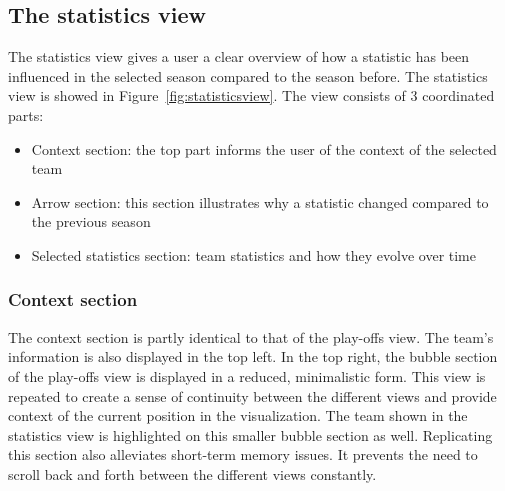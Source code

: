 \documentclass[chi_draft]{sigchi}
\begin{document}
\subsection{The statistics view}
The statistics view gives a user a clear overview of how a statistic has been
influenced in the selected season compared to the season before. The statistics
view is showed in Figure~\ref{fig:statisticsview}. The view consists of 3
coordinated parts:
\begin{itemize}
    \item Context section: the top part informs the user of the context of the
        selected team
    \item Arrow section: this section illustrates why a statistic changed
        compared to the previous season
    \item Selected statistics section: team statistics and how they evolve over
        time
\end{itemize}

\subsubsection{Context section}
The context section is partly identical to that of the play-offs view. The
team's information is also displayed in the top left. In the top right, the
bubble section of the play-offs view is displayed in a reduced, minimalistic
form. This view is repeated to create a sense of continuity between the
different views and provide context of the current position in the
visualization. The team shown in the statistics view is highlighted on this
smaller bubble section as well. Replicating this section also alleviates
short-term memory issues. It prevents the need to scroll back and forth between
the different views constantly. 
\end{document}
